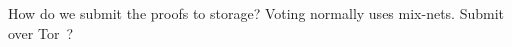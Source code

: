 \begin{frame}
  \begin{question}
    How do we submit the proofs to storage?
    Voting normally uses mix-nets.
    Submit over Tor~\cite{Tor}?
  \end{question}

\end{frame}


